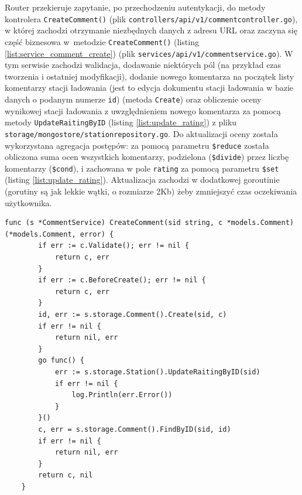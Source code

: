 Router przekieruje zapytanie, po przechodzeniu autentykacji, do metody kontrolera \texttt{CreateComment()} (plik \texttt{controllers/api/v1/commentcontroller.go}), w której zachodzi otrzymanie niezbędnych danych z adresu URL oraz zaczyna się część biznesowa w~metodzie \texttt{CreateComment()} (listing \ref{list:service_comment_create}) (plik \texttt{services/api/v1/commentservice.go}).
W tym serwisie zachodzi walidacja, dodawanie niektórych pól (na przykład czas tworzenia i ostatniej modyfikacji), dodanie nowego komentarza na początek listy komentarzy stacji ładowania (jest to edycja dokumentu stacji ładowania w bazie danych o podanym numerze \texttt{id}) (metoda \texttt{Create}) oraz obliczenie oceny wynikowej stacji ładowania z uwzględnieniem nowego komentarza za pomocą metody \texttt{UpdateRaitingByID} (listing \ref{list:update_rating}) z pliku \texttt{storage/mongostore/stationrepository.go}.
Do aktualizacji oceny została wykorzystana agregacja postępów: za pomocą parametru \texttt{\$reduce} została obliczona suma ocen wszystkich komentarzy, podzielona (\texttt{\$divide}) przez liczbę komentarzy (\texttt{\$cond}), i zachowana w pole \texttt{rating} za pomocą parametru \texttt{\$set} (listing \ref{list:update_rating}). Aktualizacja zachodzi w dodatkowej goroutinie (gorutiny są jak lekkie wątki, o rozmiarze 2Kb) żeby zmniejszyć czas oczekiwania użytkownika.


\begin{lstlisting}[label=list:service_comment_create,caption=Serwis tworzenia komentarza,basicstyle=\tiny\ttfamily]
    func (s *CommentService) CreateComment(sid string, c *models.Comment) (*models.Comment, error) {
        if err := c.Validate(); err != nil {
            return c, err
        }
        if err := c.BeforeCreate(); err != nil {
            return c, err
        }
        id, err := s.storage.Comment().Create(sid, c)
        if err != nil {
            return nil, err
        }
        go func() {
            err := s.storage.Station().UpdateRaitingByID(sid)
            if err != nil {
                log.Println(err.Error())
            }
        }()
        c, err = s.storage.Comment().FindByID(sid, id)
        if err != nil {
            return nil, err
        }
        return c, nil
    }
\end{lstlisting}
    
